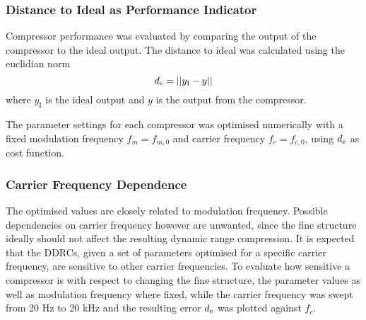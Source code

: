 \documentclass[../main2.tex]{subfiles}
\begin{document}
\subsubsection{Distance to Ideal as Performance Indicator}\label{method_dist_ideal}
Compressor performance was evaluated by comparing the output of the compressor to the ideal output. The distance to ideal was calculated using the euclidian norm
\begin{equation}
d_\text{e} = ||y_\text{I} - y||
\end{equation}
where $y_\text{I}$ is the ideal output and $y$ is the output from the compressor.

The parameter settings for each compressor was optimised numerically with a fixed modulation frequency $f_m = f_{m,0}$ and carrier frequency $f_c = f_{c,0}$, using $d_\text{e}$ as cost function.

\subsubsection{Carrier Frequency Dependence}\label{method_carrier_freq_dep}
The optimised values are closely related to modulation frequency. Possible dependencies on carrier frequency however are unwanted, since the fine structure ideally should not affect the resulting dynamic range compression. It is expected that the DDRCs, given a set of parameters optimised for a specific carrier frequency, are sensitive to other carrier frequencies. To evaluate how sensitive a compressor is with respect to changing the fine structure, the parameter values as well as modulation frequency where fixed, while the carrier frequency was swept from 20 Hz to 20 kHz and the resulting error $d_\text{e}$ was plotted against $f_c$.
\end{document}
